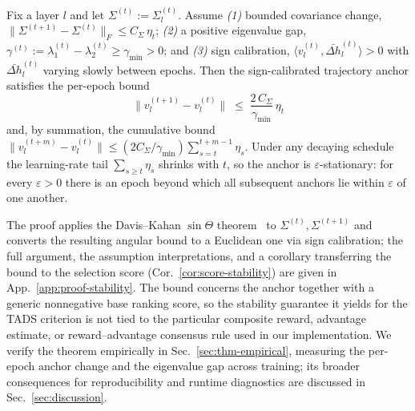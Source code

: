 \begin{theorem}
\label{thm:stability}
Fix a layer $l$ and let $\Sigma^{(t)} := \Sigma_l^{(t)}$. Assume
\emph{(1)} bounded covariance change,
$\|\Sigma^{(t+1)} - \Sigma^{(t)}\|_F \le C_\Sigma\,\eta_t$;
\emph{(2)} a positive eigenvalue gap,
$\gamma^{(t)} := \lambda_1^{(t)} - \lambda_2^{(t)} \ge
\gamma_{\min} > 0$; and \emph{(3)} sign calibration,
$\langle v_l^{(t)}, \bar{\Delta h}_l^{(t)} \rangle > 0$ with
$\bar{\Delta h}_l^{(t)}$ varying slowly between epochs. Then the
sign-calibrated trajectory anchor satisfies the per-epoch bound
\begin{equation}
  \boxed{\;\bigl\| v_l^{(t+1)} - v_l^{(t)} \bigr\|
  \;\le\;
  \frac{2\, C_\Sigma}{\gamma_{\min}}\,\eta_t\;}
  \label{eq:stability-bound}
\end{equation}
and, by summation, the cumulative bound
$\|v_l^{(t+m)} - v_l^{(t)}\| \le
(2C_\Sigma/\gamma_{\min})\sum_{s=t}^{t+m-1}\eta_s$. Under any
decaying schedule the learning-rate tail $\sum_{s\ge t}\eta_s$
shrinks with $t$, so the anchor is $\varepsilon$-stationary: for
every $\varepsilon>0$ there is an epoch beyond which all subsequent
anchors lie within $\varepsilon$ of one another.
\end{theorem}

The proof applies the Davis--Kahan $\sin\Theta$
theorem~\cite{daviskahan} to $\Sigma^{(t)}, \Sigma^{(t+1)}$ and
converts the resulting angular bound to a Euclidean one via sign
calibration; the full argument, the assumption interpretations, and
a corollary transferring the bound to the selection score
(Cor.~\ref{cor:score-stability}) are given in
App.~\ref{app:proof-stability}. The bound concerns the anchor
together with a generic nonnegative base ranking score, so the
stability guarantee it yields for the \textsc{TADS} criterion is not
tied to the particular composite reward, advantage estimate, or
reward--advantage consensus rule used in our implementation. We verify
the theorem empirically in Sec.~\ref{sec:thm-empirical}, measuring
the per-epoch anchor change and the eigenvalue gap across training;
its broader consequences for reproducibility and runtime diagnostics
are discussed in Sec.~\ref{sec:discussion}.
